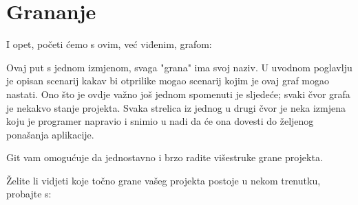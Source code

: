 \chapter*{Grananje}

I opet, početi ćemo s ovim, već viđenim, grafom:



Ovaj put s jednom izmjenom, svaga "grana" ima svoj naziv.
U uvodnom poglavlju je opisan scenarij kakav bi otprilike mogao scenarij kojim je ovaj graf mogao nastati.
Ono što je ovdje važno još jednom spomenuti je sljedeće; svaki čvor grafa je nekakvo stanje projekta. 
Svaka strelica iz jednog u drugi čvor je neka izmjena koju je programer napravio i snimio u nadi da će ona dovesti do željenog ponašanja aplikacije.

Git vam omogućuje da jednostavno i brzo radite višestruke grane projekta.

Želite li vidjeti koje točno grane vašeg projekta postoje u nekom trenutku, probajte s:



